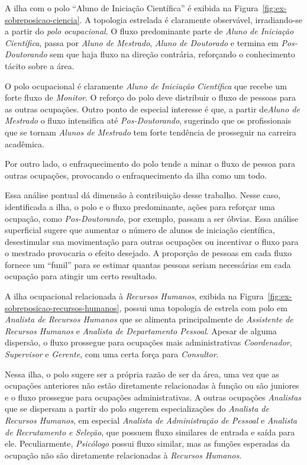 \documentclass[
  article,
  11pt,
  a4paper,
  english,
  brazil,
  sumario=tradicional]{abntex2}
\begin{document}
A ilha com o polo \enquote{Aluno de Iniciação Científica} é exibida na Figura~\ref{fig:ex-sobreposicao-ciencia}. A topologia estrelada é claramente observável, irradiando-se a partir do \textit{polo ocupacional}. O fluxo predominante parte de \textit{Aluno de Iniciação Científica}, passa por \textit{Aluno de Mestrado}, \textit{Aluno de Doutorado} e termina em \textit{Pos-Doutorando} sem que haja fluxo na direção contrária, reforçando o conhecimento tácito sobre a área.

O polo ocupacional é claramente \textit{Aluno de Iniciação Científica} que recebe um forte fluxo de \textit{Monitor}. O reforço do polo deve distribuir o fluxo de pessoas para as outras ocupações. Outro ponto de especial interesse é que, a partir de\textit{Aluno de Mestrado} o fluxo intensifica até \textit{Pos-Doutorando}, sugerindo que os profissionais que se tornam \textit{Alunos de Mestrado} tem forte tendência de prosseguir na carreira acadêmica.

Por outro lado, o enfraquecimento do polo tende a minar o fluxo de pessoa para outras ocupações, provocando o enfraquecimento da ilha como um todo.

Essa análise pontual dá dimensão à contribuição desse trabalho. Nesse caso, identificada a ilha, o polo e o fluxo predominante,  ações para reforçar uma ocupação, como \textit{Pos-Doutorando}, por exemplo, passam a ser óbvias. Essa análise superficial sugere que aumentar o número de alunos de iniciação científica, desestimular sua movimentação para outras ocupações ou incentivar o fluxo para o mestrado provocaria o efeito desejado. A proporção de pessoas em cada fluxo fornece um \enquote{funil} para se estimar quantas pessoas seriam necessárias em cada ocupação para atingir um certo resultado.

A ilha ocupacional relacionada à \textit{Recursos Humanos}, exibida na Figura~\ref{fig:ex-sobreposicao-recursos-humanos}, possui uma topologia de estrela com polo em \textit{Analista de Recursos Humanos} que se alimenta principalmente de \textit{Assistente de Recursos Humanos} e \textit{Analista de Departamento Pessoal}. Apesar de alguma dispersão, o fluxo prossegue para ocupações mais administrativas \textit{Coordenador}, \textit{Supervisor} e \textit{Gerente}, com uma certa força para \textit{Consultor}.

Nessa ilha, o polo sugere ser a própria razão de ser da área, uma vez que as ocupações anteriores não estão diretamente relacionadas à função ou são juniores e o fluxo prossegue para ocupações administrativas. A outras ocupações \textit{Analistas} que se dispersam a partir do polo sugerem especializações do \textit{Analista de Recursos Humanos}, em especial \textit{Analista de Administração de Pessoal} e \textit{Analista de Recrutamento e Seleção}, que possuem fluxo similares de entrada e saída para ele. Peculiarmente, \textit{Psicólogo} possui fluxo similar, mas as funções esperadas da ocupação não são diretamente relacionadas à \textit{Recursos Humanos}.
\end{document}
